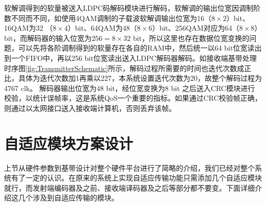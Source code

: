 软解调得到的软量被送入LDPC码解码模块进行解码，软解调的输出位宽因调制阶数不同而不同，如使用4QAM调制的子载波软解调输出位宽为16（$8\times 2$）bit、16QAM为32 （$8\times 4$）bit、64QAM为48（$8\times 6$）bit、256QAM对应为64（$8\times 8$）bit，而解码器的输入位宽为$256=8\times 32$ bit，所以这里也存在数据位宽变换的问题，可以先将各阶调制得到的软量存在各自的RAM中，然后统一以64 bit位宽读出到一个FIFO中，再以256 bit位宽读出送入LDPC解码器解码。如接收端基带处理时序图\ref{fig:TransmitterSchematic}所示，解码过程所需要的时间也迭代次数成正比，具体为迭代次数加1再乘以227，本系统设置迭代次数为20，故整个解码过程为4767 clk。 解码器输出位宽为48 bit，经位宽变换为8 bit 之后送入CRC模块进行校验，以统计误帧率，这是系统QoS一个重要的指标。如果通过CRC校验帧正确，则通过以太网接口送入接收端计算机，否则丢弃该帧。


\section{自适应模块方案设计}
上节从硬件参数到基带设计对整个硬件平台进行了简略的介绍，我们已经对整个系统有了一定的认识。在原来的系统上实现自适应传输功能只需添加几个自适应模块就行，而发射端编码器及之前、接收端译码器及之后等部分都不要变。下面详细介绍这几个涉及到自适应传输的模块。

